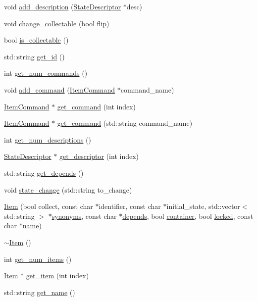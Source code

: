 \begin{DoxyCompactItemize}
\item 
void \hyperlink{class_item_af6e0efea4346f669ac5479b258511e68}{add\-\_\-description} (\hyperlink{class_state_descriptor}{\-State\-Descriptor} $\ast$desc)
\item 
void \hyperlink{class_item_ab8c43c172fbff161c8c2ca765ded9537}{change\-\_\-collectable} (bool flip)
\item 
bool \hyperlink{class_item_a91f14a96cab681bc02dee3f9c9e6af5d}{is\-\_\-collectable} ()
\item 
std\-::string \hyperlink{class_item_a7a3aedd7ab7f81327f57343dcb55d42d}{get\-\_\-id} ()
\item 
int \hyperlink{class_item_a9f09c704274546d5bd0903d0cddfd194}{get\-\_\-num\-\_\-commands} ()
\item 
void \hyperlink{class_item_ab78d891c3aed983ea7b2e5311b0da68c}{add\-\_\-command} (\hyperlink{class_item_command}{\-Item\-Command} $\ast$command\-\_\-name)
\item 
\hyperlink{class_item_command}{\-Item\-Command} $\ast$ \hyperlink{class_item_a2d460d0ac5130e9fd5c05bd3d823a224}{get\-\_\-command} (int index)
\item 
\hyperlink{class_item_command}{\-Item\-Command} $\ast$ \hyperlink{class_item_a62cc63f4b60feeb555226eceb851d7de}{get\-\_\-command} (std\-::string command\-\_\-name)
\item 
int \hyperlink{class_item_a41e3300333fa679000fa94f6d5073268}{get\-\_\-num\-\_\-descriptions} ()
\item 
\hyperlink{class_state_descriptor}{\-State\-Descriptor} $\ast$ \hyperlink{class_item_a53ca85af0ed1581f08b7cb143ea9474c}{get\-\_\-descriptor} (int index)
\item 
std\-::string \hyperlink{class_item_abccfd47cb27c2631d90e44a7341bb3b3}{get\-\_\-depends} ()
\item 
void \hyperlink{class_item_a3ec1f16ad405a8ddf9ae82a48de551ff}{state\-\_\-change} (std\-::string to\-\_\-change)
\item 
\hyperlink{class_item_a434bfe64181261c9e4b69db7863b947e}{\-Item} (bool collect, const char $\ast$identifier, const char $\ast$initial\-\_\-state, std\-::vector$<$ std\-::string $>$ $\ast$\hyperlink{class_item_a7194157fbfb03b0f18a26c9653bb5ece}{synonyms}, const char $\ast$\hyperlink{class_item_a921cd9db367f9d02a79667add82b2e04}{depends}, bool \hyperlink{class_item_a7f22375d075c99d1ecfc3f535f74d43f}{container}, bool \hyperlink{class_item_ad83d99679394b23a06681d21eacd312e}{locked}, const char $\ast$\hyperlink{class_item_a342b7a351c9ae1c5430aa3ef65b670bd}{name})
\item 
\hyperlink{class_item_a11663c84075b78c3ae5e30fdfcd7c458}{$\sim$\-Item} ()
\item 
int \hyperlink{class_item_a5c0702ac713015d393aa00304ac56dd6}{get\-\_\-num\-\_\-items} ()
\item 
\hyperlink{class_item}{\-Item} $\ast$ \hyperlink{class_item_ac60146c5a0b1dfc8147607cdce6fc7de}{get\-\_\-item} (int index)
\item 
std\-::string \hyperlink{class_item_a2ba411f27235d4061d28569d59b74d41}{get\-\_\-name} ()
\end{DoxyCompactItemize}

